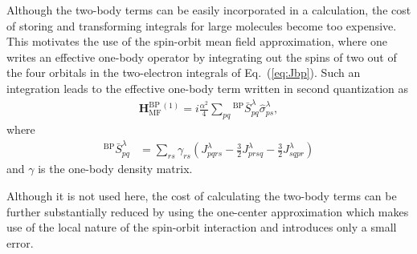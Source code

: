 \documentclass[10pt,aps,prb,twocolumn,amsmath,amssymb,superscriptaddress]{revtex4-1}
\renewcommand\b[1]{\ensuremath{\mathbf{#1}}}
\begin{document}
Although the two-body terms can be easily incorporated in a calculation, the cost of storing and transforming integrals for large molecules become too expensive. This motivates the use of the spin-orbit mean field approximation\cite{Hessetal,Marian1996,Li2014}, where one writes an effective one-body operator by integrating out the spins of two out of the four orbitals in the two-electron integrals of Eq.~(\ref{eq:Jbp}).
Such an integration leads to the effective one-body term\cite{Hessetal} written in second quantization as
\begin{align}
    \b{H}^\text{BP}_\text{MF}{}^{(1)}=i\frac{\alpha^2}{4} \sum_{pq} {}^\text{BP}\!\bar{S}^\lambda_{pq} \hat{\sigma}_{ps}^\lambda,
\label{eq:BPsomf}
\end{align}
where
\begin{align}
    ^\text{BP}\!\bar{S}^\lambda_{pq}
    &=  \sum_{rs} \gamma_{rs} \left(J_{pqrs}^\lambda -\frac{3}{2} J_{prsq}^\lambda-\frac{3}{2} J_{sqpr}^\lambda\right)
     \label{eq:Sbpmf}
\end{align}
and $\gamma$ is the one-body density matrix.

Although it is not used here, the cost of calculating the two-body terms can be further substantially reduced by using the one-center approximation which makes use of the local nature of the spin-orbit interaction and introduces only a small error\cite{amfi}.
\end{document}
